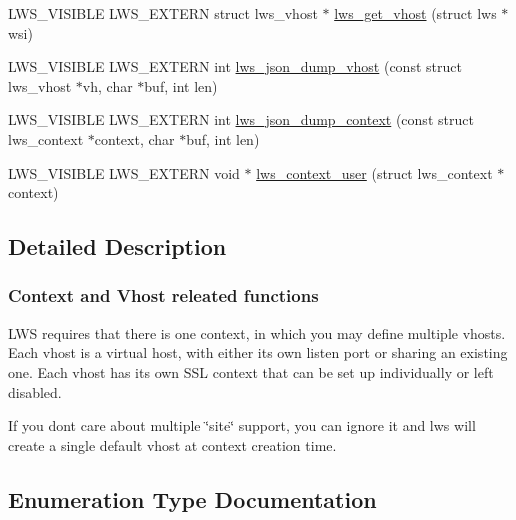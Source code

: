 \begin{DoxyCompactItemize}
\item 
L\+W\+S\+\_\+\+V\+I\+S\+I\+B\+LE L\+W\+S\+\_\+\+E\+X\+T\+E\+RN struct lws\+\_\+vhost $\ast$ \hyperlink{group__context-and-vhost_ga06e77ce2916f8bc9826ef8d9d68e3932}{lws\+\_\+get\+\_\+vhost} (struct lws $\ast$wsi)
\item 
L\+W\+S\+\_\+\+V\+I\+S\+I\+B\+LE L\+W\+S\+\_\+\+E\+X\+T\+E\+RN int \hyperlink{group__context-and-vhost_ga94e6cc2223c4eec316b13bcebc3628b6}{lws\+\_\+json\+\_\+dump\+\_\+vhost} (const struct lws\+\_\+vhost $\ast$vh, char $\ast$buf, int len)
\item 
L\+W\+S\+\_\+\+V\+I\+S\+I\+B\+LE L\+W\+S\+\_\+\+E\+X\+T\+E\+RN int \hyperlink{group__context-and-vhost_gae2134657cdd2ea7a59e13ad314e4c50d}{lws\+\_\+json\+\_\+dump\+\_\+context} (const struct lws\+\_\+context $\ast$context, char $\ast$buf, int len)
\item 
L\+W\+S\+\_\+\+V\+I\+S\+I\+B\+LE L\+W\+S\+\_\+\+E\+X\+T\+E\+RN void $\ast$ \hyperlink{group__context-and-vhost_gaeb12f934bfd178bd2132a9e73fc641da}{lws\+\_\+context\+\_\+user} (struct lws\+\_\+context $\ast$context)
\end{DoxyCompactItemize}


\subsection{Detailed Description}
\subsubsection*{Context and Vhost releated functions}

L\+WS requires that there is one context, in which you may define multiple vhosts. Each vhost is a virtual host, with either its own listen port or sharing an existing one. Each vhost has its own S\+SL context that can be set up individually or left disabled.

If you don\textquotesingle{}t care about multiple \char`\"{}site\char`\"{} support, you can ignore it and lws will create a single default vhost at context creation time. 

\subsection{Enumeration Type Documentation}

